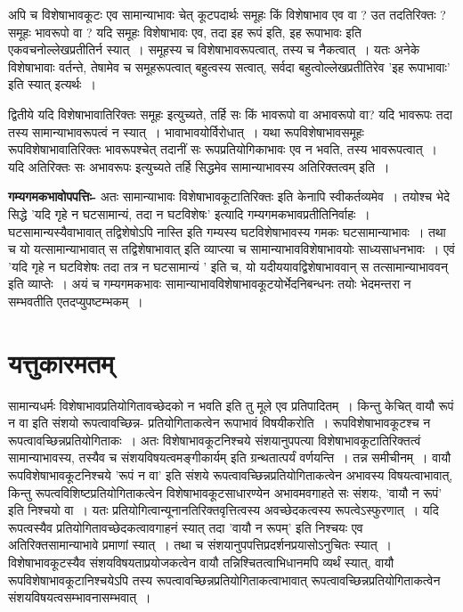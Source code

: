 {अपि च विशेषाभावकूटः एव सामान्याभावः चेत् कूटपदार्थः समूहः किं विशेषाभाव एव वा ? उत तदतिरिक्तः ? समूहः भावरूपो वा ? यदि समूहः विशेषाभावः एव, तदा इह रूपं इति, इह रूपाभावः इति एकवचनोल्लेखप्रतीतिर्न स्यात्~। समूहस्य च विशेषाभावरूपत्वात्, तस्य च नैकत्वात्~। यतः अनेके विशेषाभावाः वर्तन्ते, तेषामेव च समूहरूपत्वात् बहुत्वस्य सत्वात्, सर्वदा बहुत्वोल्लेखप्रतीतिरेव ’इह रूपाभावाः’ इति स्यात् इत्यर्थः~। 

द्वितीये यदि विशेषाभावातिरिक्तः समूहः इत्युच्यते, तर्हि सः किं भावरूपो वा अभावरूपो वा? यदि भावरूपः तदा तस्य सामान्याभावरूपत्वं न स्यात्~। भावाभावयोर्विरोधात्~। यथा रूपविशेषाभावसमूहः रूपविशेषाभावातिरिक्तः भावरूपश्चेत् तदानीं सः रूपप्रतियोगिकाभावः एव न भवति, तस्य भावरूपत्वात्~। यदि अतिरिक्तः सः अभावरूपः इत्युच्यते तर्हि सिद्धमेव सामान्याभावस्य अतिरिक्तत्वम् इति~। 

\textbf{गम्यगमकभावोपपत्तिः-} अतः सामान्याभावः विशेषाभावकूटातिरिक्तः इति केनापि स्वीकर्तव्यमेव~। तयोश्च भेदे सिद्धे ’यदि गृहे न घटसामान्यं, तदा न घटविशेषः’ इत्यादि गम्यगमकभावप्रतीतिनिर्वाहः~। घटसामान्यस्यैवाभावात् तद्विशेषोऽपि नास्ति इति गम्यस्य घटविशेषाभावस्य गमकः घटसामान्याभावः~। तथा च यो यत्सामान्याभावात् स तद्विशेषाभावात् इति व्याप्त्या च सामान्याभावविशेषाभावयोः साध्यसाधनभावः~। एवं ’यदि गृहे न घटविशेषः तदा तत्र न घटसामान्यं ’ इति च, यो यदीययावद्विशेषाभाववान् स तत्सामान्याभाववन् इति व्याप्तेः~। अयं च गम्यगमकभावः सामान्याभावविशेषाभावकूटयोर्भेदनिबन्धनः तयोः भेदमन्तरा न सम्भवतीति एतदप्युपष्टम्भकम्~। 
 	
\section*{यत्तुकारमतम्} 

सामान्यधर्मः विशेषाभावप्रतियोगितावच्छेदको न भवति इति तु मूले एव प्रतिपादितम्~। किन्तु केचित् वायौ रूपं न वा इति संशयो रूपत्वावच्छिन्न- प्रतियोगिताकत्वेन रूपाभावं विषयीकरोति~। रूपविशेषाभावकूटश्च न रूपत्वावच्छिन्नप्रतियोगिताकः~। अतः विशेषाभावकूटनिश्चये संशयानुपपत्या विशेषाभावकूटातिरिक्तत्वं सामान्याभावस्य, तस्यैव च संशयविषयत्वमङ्गीकार्यम् इति ग्रन्थतात्पर्यं वर्णयन्ति~। तन्न समीचीनम्~। वायौ रूपविशेषाभावकूटनिश्चये ’रूपं न वा’ इति संशये रूपत्वावच्छिन्नप्रतियोगिताकत्वेन अभावस्य विषयत्वाभावात्, किन्तु रूपत्वविशिष्टप्रतियोगिताकत्वेन विशेषाभावकूटसाधारण्येन अभावमवगाहते सः संशयः, ’वायौ न रूपं’ इति निश्चयो वा~। यतः प्रतियोगित्वान्यूनानतिरिक्तवृत्तित्वस्य अवच्छेदकत्वस्य रूपत्वेऽस्फुरणात्~। यदि रूपत्वस्यैव प्रतियोगितावच्छेदकत्वावगाहनं स्यात् तदा ’वायौ न रूपम्’ इति निश्चयः एव अतिरिक्तसामान्याभावे प्रमाणां स्यात्~। तथा च संशयानुपपत्तिप्रदर्शनप्रयासोऽनुचितः स्यात्~। विशेषाभावकूटस्यैव संशयविषयताप्रयोजकत्वेन वायौ तन्निश्चितत्वाभिधानमपि व्यर्थं स्यात्, वायौ रूपविशेषाभावकूटानिश्चयेऽपि तस्य रूपत्वावच्छिन्नप्रतियोगिताकत्वाभावात् रूपत्वावच्छिन्नप्रतियोगिताकत्वेन संशयविषयत्वसम्भावनासम्भवात्~। 

}
